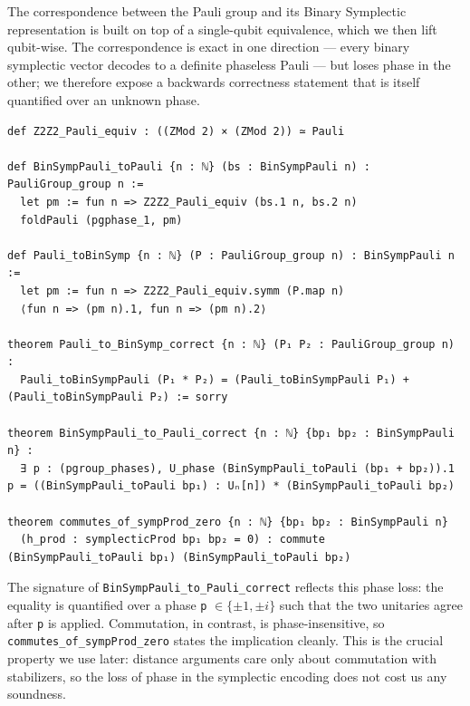 The correspondence between the Pauli group and its Binary Symplectic
representation is built on top of a single-qubit equivalence, which we then lift
qubit-wise. The correspondence is exact in one direction --- every binary
symplectic vector decodes to a definite phaseless Pauli --- but loses phase in
the other; we therefore expose a backwards correctness statement that is itself
quantified over an unknown phase.

\begin{lstlisting}
def Z2Z2_Pauli_equiv : ((ZMod 2) × (ZMod 2)) ≃ Pauli

def BinSympPauli_toPauli {n : ℕ} (bs : BinSympPauli n) : PauliGroup_group n :=
  let pm := fun n => Z2Z2_Pauli_equiv (bs.1 n, bs.2 n)
  foldPauli (pgphase_1, pm)

def Pauli_toBinSymp {n : ℕ} (P : PauliGroup_group n) : BinSympPauli n :=
  let pm := fun n => Z2Z2_Pauli_equiv.symm (P.map n)
  ⟨fun n => (pm n).1, fun n => (pm n).2⟩

theorem Pauli_to_BinSymp_correct {n : ℕ} (P₁ P₂ : PauliGroup_group n) :
  Pauli_toBinSympPauli (P₁ * P₂) = (Pauli_toBinSympPauli P₁) + (Pauli_toBinSympPauli P₂) := sorry

theorem BinSympPauli_to_Pauli_correct {n : ℕ} {bp₁ bp₂ : BinSympPauli n} :
  ∃ p : (pgroup_phases), U_phase (BinSympPauli_toPauli (bp₁ + bp₂)).1 p = ((BinSympPauli_toPauli bp₁) : Uₙ[n]) * (BinSympPauli_toPauli bp₂)

theorem commutes_of_sympProd_zero {n : ℕ} {bp₁ bp₂ : BinSympPauli n}
  (h_prod : symplecticProd bp₁ bp₂ = 0) : commute (BinSympPauli_toPauli bp₁) (BinSympPauli_toPauli bp₂)
\end{lstlisting}

%

The signature of \lstinline{BinSympPauli_to_Pauli_correct} reflects this phase
loss: the equality is quantified over a phase \lstinline{p} $\in \{\pm 1, \pm
i\}$ such that the two unitaries agree after \lstinline{p} is applied.
Commutation, in contrast, is phase-insensitive, so
\lstinline{commutes_of_sympProd_zero} states the implication cleanly. This is
the crucial property we use later: distance arguments care only about
commutation with stabilizers, so the loss of phase in the symplectic encoding
does not cost us any soundness.

